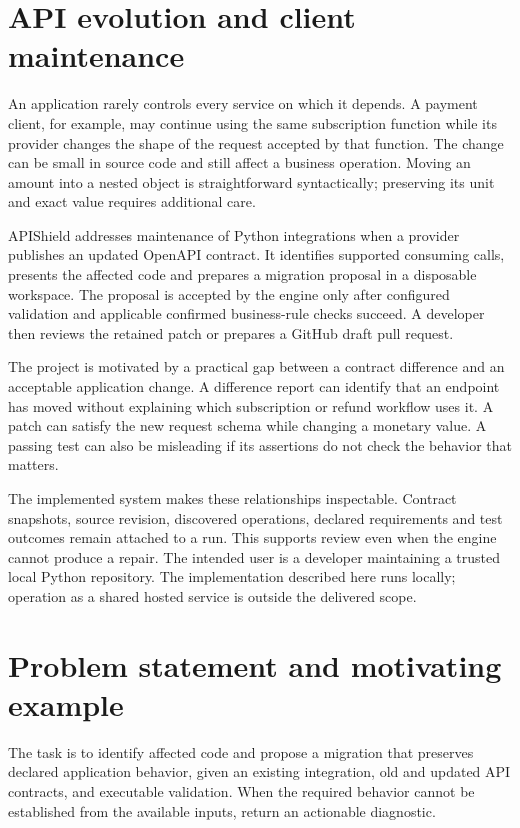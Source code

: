 \documentclass[12pt,a4paper,oneside]{report}
\begin{document}
\section{API evolution and client maintenance}

An application rarely controls every service on which it depends. A payment client, for example, may continue using the same subscription function while its provider changes the shape of the request accepted by that function. The change can be small in source code and still affect a business operation. Moving an amount into a nested object is straightforward syntactically; preserving its unit and exact value requires additional care.

APIShield addresses maintenance of Python integrations when a provider publishes an updated OpenAPI contract. It identifies supported consuming calls, presents the affected code and prepares a migration proposal in a disposable workspace. The proposal is accepted by the engine only after configured validation and applicable confirmed business-rule checks succeed. A developer then reviews the retained patch or prepares a GitHub draft pull request.

The project is motivated by a practical gap between a contract difference and an acceptable application change. A difference report can identify that an endpoint has moved without explaining which subscription or refund workflow uses it. A patch can satisfy the new request schema while changing a monetary value. A passing test can also be misleading if its assertions do not check the behavior that matters.

The implemented system makes these relationships inspectable. Contract snapshots, source revision, discovered operations, declared requirements and test outcomes remain attached to a run. This supports review even when the engine cannot produce a repair. The intended user is a developer maintaining a trusted local Python repository. The implementation described here runs locally; operation as a shared hosted service is outside the delivered scope.

\section{Problem statement and motivating example}

The task is to identify affected code and propose a migration that preserves declared application behavior, given an existing integration, old and updated API contracts, and executable validation. When the required behavior cannot be established from the available inputs, return an actionable diagnostic.
\end{document}
